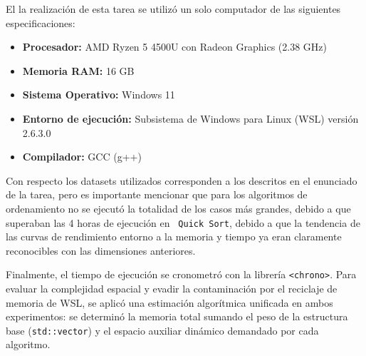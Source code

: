 El la realización de esta tarea se utilizó un solo computador de las siguientes especificaciones:

\begin{itemize}
    \item \textbf{Procesador:} AMD Ryzen 5 4500U con Radeon Graphics (2.38 GHz)
    \item \textbf{Memoria RAM:} 16 GB
    \item \textbf{Sistema Operativo:} Windows 11
    \item \textbf{Entorno de ejecución:} Subsistema de Windows para Linux (WSL) versión 2.6.3.0
    \item \textbf{Compilador:} GCC (g++)
\end{itemize}

Con respecto los datasets utilizados corresponden a los descritos en el enunciado de la tarea, pero es importante mencionar que para los algoritmos de ordenamiento no se ejecutó la totalidad de los casos más grandes, debido a que superaban las 4 horas de ejecución en  \texttt{ Quick Sort}, debido a que la tendencia de las curvas de rendimiento entorno a la memoria y tiempo ya eran claramente reconocibles con las dimensiones anteriores.

Finalmente, el tiempo de ejecución se cronometró con la librería \texttt{<chrono>}. Para evaluar la complejidad espacial y evadir la contaminación por el reciclaje de memoria de WSL, se aplicó una estimación algorítmica unificada en ambos experimentos: se determinó la memoria total sumando el peso de la estructura base (\texttt{std::vector}) y el espacio auxiliar dinámico demandado por cada algoritmo.